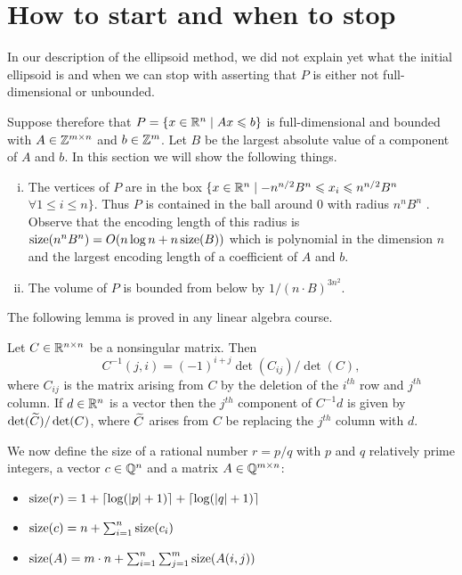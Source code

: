 \section{How to start and when to stop }
\label{el:sec:how-start-when-1}

In our description of the ellipsoid method, we did not explain yet what
the initial ellipsoid  is and when we can stop with asserting
that $P$ is either not full-dimensional or unbounded. 


Suppose therefore that $P = \{ x \in \mathbb{R}^n \mid Ax\leqslant b\}$ is
full-dimensional and bounded with $A\in \mathbb{Z}^{m\times n}$ and $b\in \mathbb{Z}^m$. Let
$B$ be the largest absolute value of a component of $A$ and $b$. In this 
section we will show the following things.  
\begin{enumerate}[i)]
\item The vertices of $P$ are in the box 
$\{x \in \mathbb{R}^n \mid -n^{n/2} B^n \leqslant x_i \leqslant n^{n/2} B^n$ 
$\forall 1 \leq i \leq n \}$. 
Thus $P$ is contained in the ball around $0$
  with radius $n^{n} B^n$ . Observe that the encoding length of this
  radius is $\operatorname{size}(n^{n}B^n) = O(n \log n + n\operatorname{size}(B))$ which is
  polynomial in the dimension $n$ and the largest encoding length of a
  coefficient of $A$ and $b$. \label{el:item:7}
\item The volume of $P$ is bounded from below by  $1 /
(n\cdot B)^{3n^2}$. \label{el:item:8}
\end{enumerate}

The following lemma is proved in any linear algebra course. 
\begin{lemma}
  \label{el:lem:11}
  Let $C \in \mathbb{R}^{n\times n}$ be a nonsingular matrix. Then 
  \begin{displaymath}
    C^{-1}(j,i) = (-1)^{i+j} \det(C_{ij}) / \det(C),
  \end{displaymath}
  where $C_{ij}$ is the matrix arising from $C$ by the deletion of the
  $i^{th}$ row and $j^{th}$ column. If $d\in \mathbb{R}^n$ is a vector 
  then the $j^{th}$ component of $C^{-1}d$ is given by
  $\det(\widetilde{C})/\det(C)$, where $\widetilde{C}$ arises from $C$ be 
  replacing the $j^{th}$ column with $d$. 
 \end{lemma}

We now define the size of a rational number $r = p/q$ with $p$ and $q$
relatively prime integers, a vector $c \in \mathbb{Q}^n$ and a matrix $A \in
\mathbb{Q}^{m\times n}$: 
\begin{itemize}
\item $\operatorname{size}(r) = 1 + \lceil\log ( |p|+1) \rceil + \lceil \log( |q|+1) \rceil$
\item $\operatorname{size}(c) = n+ \sum_{i=1}^n \operatorname{size}(c_i)$
\item $\operatorname{size}(A) = m\cdot n + \sum_{i=1}^n\sum_{j=1}^m \operatorname{size}(A(i,j))$
\end{itemize}



